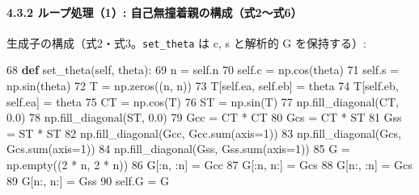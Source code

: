 \documentclass[
  a4paper,
]{ltjsarticle}
\newenvironment{Shaded}{}{}
\newcommand{\BuiltInTok}[1]{\textcolor[rgb]{0.00,0.50,0.00}{#1}}
\newcommand{\DecValTok}[1]{\textcolor[rgb]{0.25,0.63,0.44}{#1}}
\newcommand{\FloatTok}[1]{\textcolor[rgb]{0.25,0.63,0.44}{#1}}
\newcommand{\KeywordTok}[1]{\textcolor[rgb]{0.00,0.44,0.13}{\textbf{#1}}}
\newcommand{\NormalTok}[1]{#1}
\newcommand{\OperatorTok}[1]{\textcolor[rgb]{0.40,0.40,0.40}{#1}}
\newcommand{\VariableTok}[1]{\textcolor[rgb]{0.10,0.09,0.49}{#1}}
\begin{document}
\paragraph{4.3.2 ループ処理（1）:
自己無撞着親の構成（式2〜式6）}\label{ux30ebux30fcux30d7ux51e6ux74061-ux81eaux5df1ux7121ux649eux7740ux89aaux306eux69cbux6210ux5f0f2ux5f0f6}

生成子の構成（式2・式3。\texttt{set\_theta} は c, s と解析的 G
を保持する）:

\begin{Shaded}
\begin{Highlighting}[]
    \DecValTok{68}      \KeywordTok{def}\NormalTok{ set\_theta(}\VariableTok{self}\NormalTok{, theta):}
    \DecValTok{69}\NormalTok{          n }\OperatorTok{=} \VariableTok{self}\NormalTok{.n}
    \DecValTok{70}          \VariableTok{self}\NormalTok{.c }\OperatorTok{=}\NormalTok{ np.cos(theta)}
    \DecValTok{71}          \VariableTok{self}\NormalTok{.s }\OperatorTok{=}\NormalTok{ np.sin(theta)}
    \DecValTok{72}\NormalTok{          T }\OperatorTok{=}\NormalTok{ np.zeros((n, n))}
    \DecValTok{73}\NormalTok{          T[}\VariableTok{self}\NormalTok{.ea, }\VariableTok{self}\NormalTok{.eb] }\OperatorTok{=}\NormalTok{ theta}
    \DecValTok{74}\NormalTok{          T[}\VariableTok{self}\NormalTok{.eb, }\VariableTok{self}\NormalTok{.ea] }\OperatorTok{=}\NormalTok{ theta}
    \DecValTok{75}\NormalTok{          CT }\OperatorTok{=}\NormalTok{ np.cos(T)}
    \DecValTok{76}\NormalTok{          ST }\OperatorTok{=}\NormalTok{ np.sin(T)}
    \DecValTok{77}\NormalTok{          np.fill\_diagonal(CT, }\FloatTok{0.0}\NormalTok{)}
    \DecValTok{78}\NormalTok{          np.fill\_diagonal(ST, }\FloatTok{0.0}\NormalTok{)}
    \DecValTok{79}\NormalTok{          Gcc }\OperatorTok{=}\NormalTok{ CT }\OperatorTok{*}\NormalTok{ CT}
    \DecValTok{80}\NormalTok{          Gcs }\OperatorTok{=}\NormalTok{ CT }\OperatorTok{*}\NormalTok{ ST}
    \DecValTok{81}\NormalTok{          Gss }\OperatorTok{=}\NormalTok{ ST }\OperatorTok{*}\NormalTok{ ST}
    \DecValTok{82}\NormalTok{          np.fill\_diagonal(Gcc, Gcc.}\BuiltInTok{sum}\NormalTok{(axis}\OperatorTok{=}\DecValTok{1}\NormalTok{))}
    \DecValTok{83}\NormalTok{          np.fill\_diagonal(Gcs, Gcs.}\BuiltInTok{sum}\NormalTok{(axis}\OperatorTok{=}\DecValTok{1}\NormalTok{))}
    \DecValTok{84}\NormalTok{          np.fill\_diagonal(Gss, Gss.}\BuiltInTok{sum}\NormalTok{(axis}\OperatorTok{=}\DecValTok{1}\NormalTok{))}
    \DecValTok{85}\NormalTok{          G }\OperatorTok{=}\NormalTok{ np.empty((}\DecValTok{2} \OperatorTok{*}\NormalTok{ n, }\DecValTok{2} \OperatorTok{*}\NormalTok{ n))}
    \DecValTok{86}\NormalTok{          G[:n, :n] }\OperatorTok{=}\NormalTok{ Gcc}
    \DecValTok{87}\NormalTok{          G[:n, n:] }\OperatorTok{=}\NormalTok{ Gcs}
    \DecValTok{88}\NormalTok{          G[n:, :n] }\OperatorTok{=}\NormalTok{ Gcs}
    \DecValTok{89}\NormalTok{          G[n:, n:] }\OperatorTok{=}\NormalTok{ Gss}
    \DecValTok{90}          \VariableTok{self}\NormalTok{.G }\OperatorTok{=}\NormalTok{ G}
\end{Highlighting}
\end{Shaded}
\end{document}
